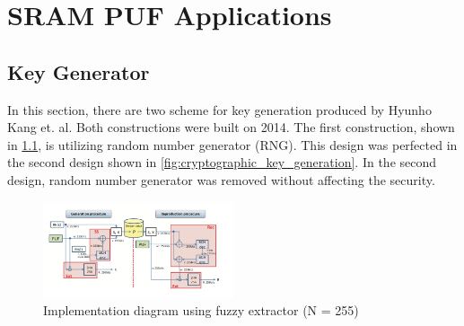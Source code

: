 \chapter{SRAM PUF Applications}

\section{Key Generator}

In this section, there are two scheme for key generation produced by Hyunho Kang et. al. Both constructions were built on 2014. The first construction, shown in \ref{fig:cryptographic_key_generation_old}, is utilizing random number generator (RNG). This design was perfected in the second design shown in \ref{fig:cryptographic_key_generation}. In the second design, random number generator was removed without affecting the security.

\begin{figure}[tph!]
	\centerline{\includegraphics[width={0.5\textwidth}]{images/crypt_key_generation_old}}
    \caption{Implementation diagram using fuzzy extractor (N = 255) \cite{cryptographic_key_generation_old}}
    \label{fig:cryptographic_key_generation_old}
\end{figure}

